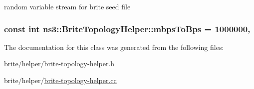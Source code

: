 random variable stream for brite seed file 

\subsubsection[{\texorpdfstring{mbps\+To\+Bps}{mbpsToBps}}]{\setlength{\rightskip}{0pt plus 5cm}const int ns3\+::\+Brite\+Topology\+Helper\+::mbps\+To\+Bps = 1000000\hspace{0.3cm}{\ttfamily [static]}, {\ttfamily [private]}}\hypertarget{classns3_1_1BriteTopologyHelper_a5fa33bdac6a048d6b66704bb846e0369}{}\label{classns3_1_1BriteTopologyHelper_a5fa33bdac6a048d6b66704bb846e0369}


The documentation for this class was generated from the following files\+:\begin{DoxyCompactItemize}
\item 
brite/helper/\hyperlink{brite-topology-helper_8h}{brite-\/topology-\/helper.\+h}\item 
brite/helper/\hyperlink{brite-topology-helper_8cc}{brite-\/topology-\/helper.\+cc}\end{DoxyCompactItemize}
